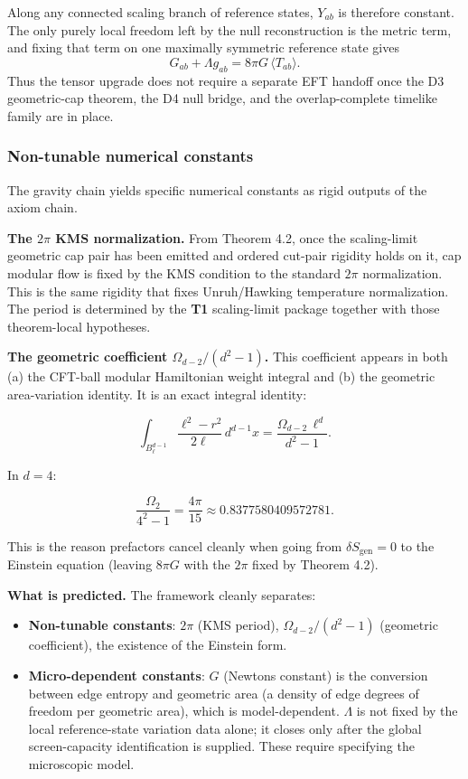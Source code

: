 Along any connected scaling branch of reference states, \(Y_{ab}\) is therefore constant. The only purely local freedom left by the null reconstruction is the metric term, and fixing that term on one maximally symmetric reference state gives
\[
G_{ab}+\Lambda g_{ab}=8\pi G\,\langle T_{ab}\rangle.
\]
Thus the tensor upgrade does not require a separate EFT handoff once the D3 geometric-cap theorem, the D4 null bridge, and the overlap-complete timelike family are in place.

\subsubsection{Non-tunable numerical constants}\label{58-non-tunable-numerical-constants}

The gravity chain yields specific numerical constants as rigid outputs of the axiom chain.

\textbf{The \(2\pi\) KMS normalization.} From Theorem 4.2, once the scaling-limit geometric cap pair has been emitted and ordered cut-pair rigidity holds on it, cap modular flow is fixed by the KMS condition to the standard \(2\pi\) normalization. This is the same rigidity that fixes Unruh/Hawking temperature normalization. The period is determined by the \textbf{T1} scaling-limit package together with those theorem-local hypotheses.

\textbf{The geometric coefficient \(\Omega_{d-2}/(d^2 - 1)\).} This coefficient appears in both (a) the CFT-ball modular Hamiltonian weight integral and (b) the geometric area-variation identity. It is an exact integral identity:

\[
\int_{B^{d-1}_\ell} \frac{\ell^2 - r^2}{2\ell} \, d^{d-1}x
= \frac{\Omega_{d-2} \, \ell^d}{d^2 - 1}.
\]

In \(d = 4\):

\[
\frac{\Omega_2}{4^2 - 1} = \frac{4\pi}{15} \approx 0.8377580409572781.
\]

This is the reason prefactors cancel cleanly when going from \(\delta S_{\mathrm{gen}} = 0\) to the Einstein equation (leaving \(8\pi G\) with the \(2\pi\) fixed by Theorem 4.2).

\textbf{What is predicted.} The framework cleanly separates:

\begin{itemize}
\tightlist
\item
  \textbf{Non-tunable constants}: \(2\pi\) (KMS period), \(\Omega_{d-2}/(d^2-1)\) (geometric coefficient), the existence of the Einstein form.
\item
  \textbf{Micro-dependent constants}: \(G\) (Newton\textquotesingle s constant) is the conversion between edge entropy and geometric area (a density of edge degrees of freedom per geometric area), which is model-dependent. \(\Lambda\) is not fixed by the local reference-state variation data alone; it closes only after the global screen-capacity identification is supplied. These require specifying the microscopic model.
\end{itemize}

